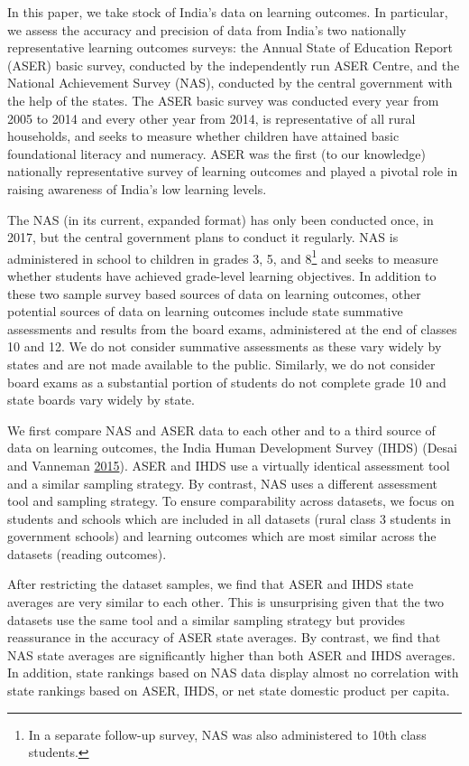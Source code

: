 \documentclass[
  11pt,
]{article}
\begin{document}
In this paper, we take stock of India's data on learning outcomes. In particular, we assess the accuracy and precision of data from India's two nationally representative learning outcomes surveys: the Annual State of Education Report (ASER) basic survey, conducted by the independently run ASER Centre, and the National Achievement Survey (NAS), conducted by the central government with the help of the states. The ASER basic survey was conducted every year from 2005 to 2014 and every other year from 2014, is representative of all rural households, and seeks to measure whether children have attained basic foundational literacy and numeracy. ASER was the first (to our knowledge) nationally representative survey of learning outcomes and played a pivotal role in raising awareness of India's low learning levels.

The NAS (in its current, expanded format) has only been conducted once, in 2017, but the central government plans to conduct it regularly. NAS is administered in school to children in grades 3, 5, and 8\footnote{In a separate follow-up survey, NAS was also administered to 10th class students.} and seeks to measure whether students have achieved grade-level learning objectives. In addition to these two sample survey based sources of data on learning outcomes, other potential sources of data on learning outcomes include state summative assessments and results from the board exams, administered at the end of classes 10 and 12. We do not consider summative assessments as these vary widely by states and are not made available to the public. Similarly, we do not consider board exams as a substantial portion of students do not complete grade 10 and state boards vary widely by state.

We first compare NAS and ASER data to each other and to a third source of data on learning outcomes, the India Human Development Survey (IHDS) (Desai and Vanneman \protect\hyperlink{ref-desai2015india}{2015}). ASER and IHDS use a virtually identical assessment tool and a similar sampling strategy. By contrast, NAS uses a different assessment tool and sampling strategy. To ensure comparability across datasets, we focus on students and schools which are included in all datasets (rural class 3 students in government schools) and learning outcomes which are most similar across the datasets (reading outcomes).

After restricting the dataset samples, we find that ASER and IHDS state averages are very similar to each other. This is unsurprising given that the two datasets use the same tool and a similar sampling strategy but provides reassurance in the accuracy of ASER state averages. By contrast, we find that NAS state averages are significantly higher than both ASER and IHDS averages. In addition, state rankings based on NAS data display almost no correlation with state rankings based on ASER, IHDS, or net state domestic product per capita.
\end{document}
